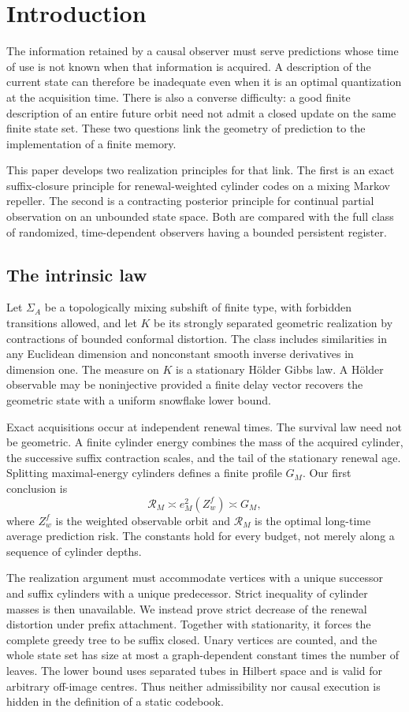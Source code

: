 \section{Introduction}\label{sec:v6-intro}
The information retained by a causal observer must serve predictions
whose time of use is not known when that information is acquired.
A description of the current state can therefore be inadequate even
when it is an optimal quantization at the acquisition time. There is
also a converse difficulty: a good finite description of an entire
future orbit need not admit a closed update on the same finite state
set. These two questions link the geometry of prediction to the
implementation of a finite memory.

This paper develops two realization principles for that link. The
first is an exact suffix-closure principle for renewal-weighted
cylinder codes on a mixing Markov repeller. The second is a contracting
posterior principle for continual partial observation on an unbounded
state space. Both are compared with the full class of randomized,
time-dependent observers having a bounded persistent register.

\subsection{The intrinsic law}
Let $\Sigma_A$ be a topologically mixing subshift of finite type, with
forbidden transitions allowed, and let $K$ be its strongly separated
geometric realization by contractions of bounded conformal distortion.
The class includes similarities in any Euclidean dimension and
nonconstant smooth inverse derivatives in dimension one. The measure
on $K$ is a stationary H\"older Gibbs law. A H\"older observable may
be noninjective provided a finite delay vector recovers the geometric
state with a uniform snowflake lower bound.

Exact acquisitions occur at independent renewal times. The survival
law need not be geometric. A finite cylinder energy combines the mass
of the acquired cylinder, the successive suffix contraction scales,
and the tail of the stationary renewal age. Splitting maximal-energy
cylinders defines a finite profile $G_M$. Our first conclusion is
\[
       \mathcal R_M\asymp e_M^2(Z_w^f)\asymp G_M,
\]
where $Z_w^f$ is the weighted observable orbit and $\mathcal R_M$ is
the optimal long-time average prediction risk. The constants hold for
every budget, not merely along a sequence of cylinder depths.

The realization argument must accommodate vertices with a unique
successor and suffix cylinders with a unique predecessor. Strict
inequality of cylinder masses is then unavailable. We instead prove
strict decrease of the renewal distortion under prefix attachment.
Together with stationarity, it forces the complete greedy tree to be
suffix closed. Unary vertices are counted, and the whole state set
has size at most a graph-dependent constant times the number of
leaves. The lower bound uses separated tubes in Hilbert space and is
valid for arbitrary off-image centres. Thus neither admissibility nor
causal execution is hidden in the definition of a static codebook.


